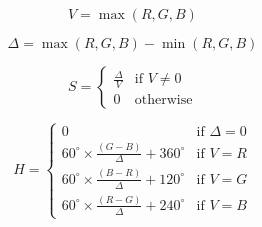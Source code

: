 \documentclass{article}
\begin{document}
\begin{equation}
V = \max(R, G, B)
\end{equation}
\pagebreak

\begin{equation}
\Delta = \max(R, G, B) - \min(R, G, B)
\end{equation}
\pagebreak

\begin{equation}
S = \begin{cases} 
  \frac{\Delta}{V} & \text{if } V \neq 0 \\
    0 & \text{otherwise}
  \end{cases}
\end{equation}
\pagebreak

\begin{equation}
H = \begin{cases} 
  0 & \text{if } \Delta = 0 \\
    60^\circ \times \frac{(G - B)}{\Delta} + 360^\circ & \text{if } V = R \\
    60^\circ \times \frac{(B - R)}{\Delta} + 120^\circ & \text{if } V = G \\
    60^\circ \times \frac{(R - G)}{\Delta} + 240^\circ & \text{if } V = B
  \end{cases}
\end{equation}
\pagebreak
\end{document}
